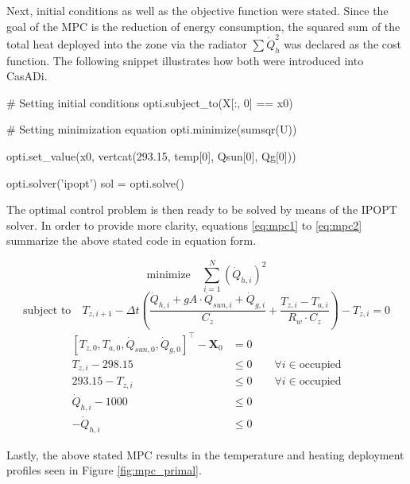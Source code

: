 Next, initial conditions as well as the objective function were stated. Since the goal of the MPC is the reduction of energy consumption, the squared sum of the total heat deployed into the zone via the radiator $\sum \dot{Q}_{h}^2$ was declared as the cost function. The following snippet illustrates how both were introduced into CasADi.

\begin{python}
# Setting initial conditions
opti.subject_to(X[:, 0] == x0)

# Setting minimization equation
opti.minimize(sumsqr(U))

opti.set_value(x0, vertcat(293.15, temp[0], Qsun[0], Qg[0]))

opti.solver('ipopt')
sol = opti.solve()
\end{python}

The optimal control problem is then ready to be solved by means of the IPOPT solver. In order to provide more clarity, equations \ref{eq:mpc1} to \ref{eq:mpc2} summarize the above stated code in equation form.


\begin{equation}
{\text{minimize}} \hspace{1em} \sum_{i=1}^{N} \left(\dot{Q}_{h,i}\right)^2
\label{eq:mpc1}
\end{equation}
\begin{equation}
\text{subject to}  \hspace{1em} T_{z,i+1} - \Delta t \left( \frac{\dot{Q}_{h,i} + gA \cdot \dot{Q}_{sun, i} + \dot{Q}_{g,i}}{C_z} + \frac{T_{z,i}-T_{a,i}}{R_w \cdot C_z} \right) - T_{z,i} =0
\end{equation}
\vspace{-0.5em}
\begin{align}
\left[T_{z,0}, T_{a,0}, \dot{Q}_{sun,0}, \dot{Q}_{g,0}\right]^{\top}  - \boldsymbol{X}_0 &=  0 \\[0.5em]
T_{z,i} - 298.15 &\leq 0 \hspace{2em} \forall i \in \text{occupied}\\[0.5em]
293.15 - T_{z,i} &\leq 0 \hspace{2em} \forall i \in \text{occupied}\\[0.5em]
\dot{Q}_{h,i} - 1000 &\leq 0\\[0.5em]
-\dot{Q}_{h,i} &\leq 0
\label{eq:mpc2}
\end{align}

Lastly, the above stated MPC results in the temperature and heating deployment profiles seen in Figure \ref{fig:mpc_primal}.

